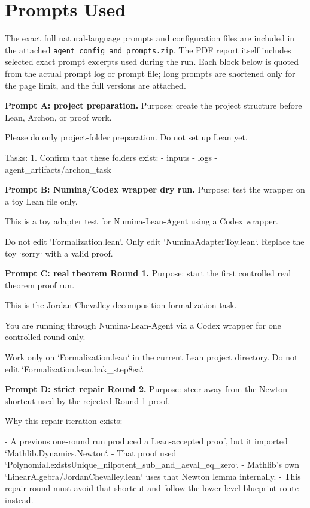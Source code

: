 \documentclass[12pt]{article}
\begin{document}
\section{Prompts Used}

The exact full natural-language prompts and configuration files are included in the attached \texttt{agent\_config\_and\_prompts.zip}. The PDF report itself includes selected exact prompt excerpts used during the run. Each block below is quoted from the actual prompt log or prompt file; long prompts are shortened only for the page limit, and the full versions are attached.

\textbf{Prompt A: project preparation.} Purpose: create the project structure before Lean, Archon, or proof work.

\begin{PromptBlock}
Please do only project-folder preparation. Do not set up Lean yet.

Tasks:
1. Confirm that these folders exist:
   - inputs
   - logs
   - agent_artifacts/archon_task
\end{PromptBlock}

\textbf{Prompt B: Numina/Codex wrapper dry run.} Purpose: test the wrapper on a toy Lean file only.

\begin{PromptBlock}
This is a toy adapter test for Numina-Lean-Agent using a Codex wrapper.

Do not edit `Formalization.lean`.
Only edit `NuminaAdapterToy.lean`.
Replace the toy `sorry` with a valid proof.
\end{PromptBlock}

\textbf{Prompt C: real theorem Round 1.} Purpose: start the first controlled real theorem proof run.

\begin{PromptBlock}
This is the Jordan-Chevalley decomposition formalization task.

You are running through Numina-Lean-Agent via a Codex wrapper for one controlled round only.

Work only on `Formalization.lean` in the current Lean project directory.
Do not edit `Formalization.lean.bak_step8ea`.
\end{PromptBlock}

\textbf{Prompt D: strict repair Round 2.} Purpose: steer away from the Newton shortcut used by the rejected Round 1 proof.

\begin{PromptBlock}
Why this repair iteration exists:

- A previous one-round run produced a Lean-accepted proof, but it imported `Mathlib.Dynamics.Newton`.
- That proof used `Polynomial.existsUnique_nilpotent_sub_and_aeval_eq_zero`.
- Mathlib's own `LinearAlgebra/JordanChevalley.lean` uses that Newton lemma internally.
- This repair round must avoid that shortcut and follow the lower-level blueprint route instead.
\end{PromptBlock}
\end{document}
